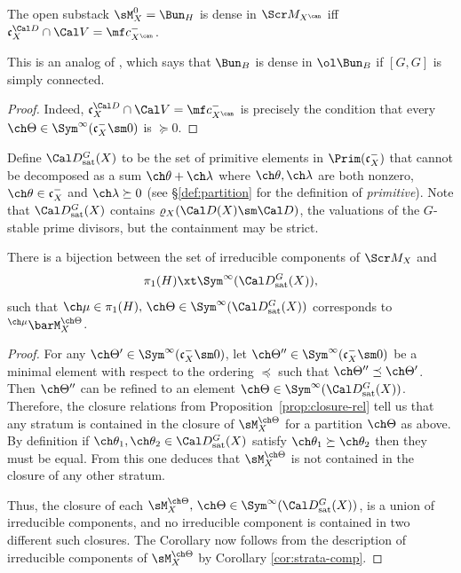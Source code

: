 \begin{cor}
\notready  \label{cor:can-comp}
The open substack $\sM_X^0 = \Bun_H$ is dense in $\Scr M_{X^\can}$ iff $\mathfrak c_X^{\Cal D} \cap \Cal V = \mf c_{X^\can}^-$.
\end{cor}

This is an analog of \cite[Proposition 1.2.3]{BG}, which says that
$\Bun_B$ is dense in $\ol\Bun_B$ if $[G,G]$ is simply connected.

\begin{proof}
Indeed, $\mathfrak c_X^{\Cal D} \cap \Cal V = \mf c_{X^\can}^-$ is precisely the condition that every $\ch\Theta \in \Sym^\infty(\mathfrak c_X^- \sm 0)$ is $\succeq 0$.
\end{proof}


Define $\Cal D^G_{\mathrm{sat}}(X)$ to be
the set of primitive elements in $\Prim(\mathfrak c_X^-)$ that
cannot be decomposed as a sum $\ch\theta+\ch\lambda$ where
$\ch\theta,\ch\lambda$ are both nonzero,
$\ch\theta \in \mathfrak c_X^-$
and $\ch\lambda \succeq 0$ (see \S\ref{def:partition} for
the definition of \emph{primitive}).
Note that $\Cal D^G_{\mathrm{sat}}(X)$ contains $\varrho_X(\Cal D(X)\sm \Cal D)$,
the valuations of the $G$-stable prime divisors,
but the containment may be strict.



\begin{cor}
\notready \label{cor:comp}
 There is a bijection between the set of irreducible
components of $\Scr M_X$ and
\[ \pi_1(H) \xt \Sym^\infty(\Cal D^G_{\mathrm{sat}}(X)), \]
such that $\ch\mu \in \pi_1(H),\, \ch\Theta \in  \Sym^\infty(\Cal D^G_{\mathrm{sat}}(X))$ corresponds to
$^{\ch\mu}\barM_X^{\ch\Theta}$.
\end{cor}

\begin{proof}
 For any $\ch\Theta' \in \Sym^\infty(\mathfrak c_X^- \sm 0)$,
let $\ch\Theta'' \in \Sym^\infty(\mathfrak c_X^-\sm 0)$
be a minimal element with respect to the ordering $\preceq$
such that $\ch\Theta'' \preceq \ch\Theta'$.
Then $\ch\Theta''$ can be refined to an element $\ch\Theta\in \Sym^\infty(\Cal D^G_{\mathrm{sat}}(X))$. Therefore, the closure relations
from Proposition~\ref{prop:closure-rel} tell us that any stratum
is contained in the closure of $\sM^{\ch\Theta}_X$ for a partition
$\ch\Theta$ as above.
By definition if $\ch\theta_1,\ch\theta_2\in \Cal D^G_{\mathrm{sat}}(X)$
satisfy $\ch\theta_1\succeq \ch\theta_2$ then they must be equal.
From this one deduces that $\sM^{\ch\Theta}_X$ is not contained
in the closure of any other stratum.

Thus, the closure of each
$\sM^{\ch\Theta}_X,\, \ch\Theta\in \Sym^\infty(\Cal D^G_{\mathrm{sat}}(X))$,
is a union of irreducible components, and no irreducible component
is contained in two different such closures. The Corollary now follows from the description of irreducible components of $\sM^{\ch\Theta}_X$ by Corollary \ref{cor:strata-comp}.
\end{proof}


